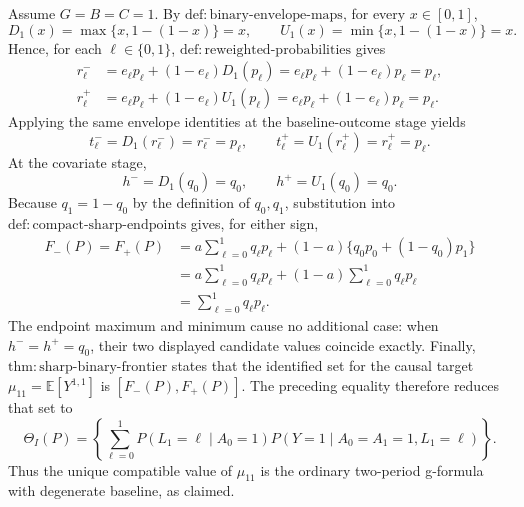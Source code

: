 Assume \(G=B=C=1\).  By \(\mathrm{def{:}binary\text{-}envelope\text{-}maps}\), for every \(x\in[0,1]\),
\[
D_1(x)=\max\{x,1-(1-x)\}=x,
\qquad
U_1(x)=\min\{x,1-(1-x)\}=x.
\]
Hence, for each \(\ell\in\{0,1\}\), \(\mathrm{def{:}reweighted\text{-}probabilities}\) gives
\[
\begin{aligned}
r_\ell^-
 &=e_\ell p_\ell+(1-e_\ell)D_1(p_\ell)
  =e_\ell p_\ell+(1-e_\ell)p_\ell=p_\ell,\\
r_\ell^+
 &=e_\ell p_\ell+(1-e_\ell)U_1(p_\ell)
  =e_\ell p_\ell+(1-e_\ell)p_\ell=p_\ell.
\end{aligned}
\]
Applying the same envelope identities at the baseline-outcome stage yields
\[
t_\ell^-=D_1(r_\ell^-)=r_\ell^-=p_\ell,
\qquad
t_\ell^+=U_1(r_\ell^+)=r_\ell^+=p_\ell.
\]
At the covariate stage,
\[
h^-=D_1(q_0)=q_0,
\qquad
h^+=U_1(q_0)=q_0.
\]
Because \(q_1=1-q_0\) by the definition of \(q_0,q_1\), substitution into \(\mathrm{def{:}compact\text{-}sharp\text{-}endpoints}\) gives, for either sign,
\[
\begin{aligned}
F_-(P)=F_+(P)
 &=a\sum_{\ell=0}^1q_\ell p_\ell
   +(1-a)\{q_0p_0+(1-q_0)p_1\}\\
 &=a\sum_{\ell=0}^1q_\ell p_\ell
   +(1-a)\sum_{\ell=0}^1q_\ell p_\ell\\
 &=\sum_{\ell=0}^1q_\ell p_\ell.
\end{aligned}
\]
The endpoint maximum and minimum cause no additional case: when \(h^-=h^+=q_0\), their two displayed candidate values coincide exactly.  Finally, \(\mathrm{thm{:}sharp\text{-}binary\text{-}frontier}\) states that the identified set for the causal target \(\mu_{11}=\mathbb E[Y^{1,1}]\) is \([F_-(P),F_+(P)]\).  The preceding equality therefore reduces that set to
\[
\Theta_I(P)=\left\{\sum_{\ell=0}^1
P(L_1=\ell\mid A_0=1)
P(Y=1\mid A_0=A_1=1,L_1=\ell)\right\}.
\]
Thus the unique compatible value of \(\mu_{11}\) is the ordinary two-period g-formula with degenerate baseline, as claimed.
